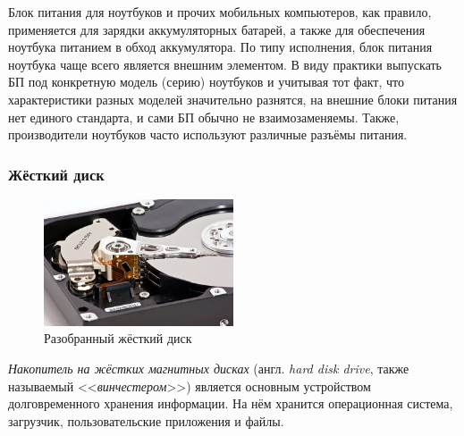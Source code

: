 Блок питания для ноутбуков и прочих мобильных компьютеров, как правило, применяется для зарядки аккумуляторных батарей, а также для обеспечения ноутбука питанием в обход аккумулятора.
По типу исполнения, блок питания ноутбука чаще всего является внешним элементом.
В виду практики выпускать БП под конкретную модель (серию) ноутбуков и учитывая тот факт, что характеристики разных моделей значительно разнятся, на внешние блоки питания нет единого стандарта, и сами БП обычно не взаимозаменяемы.
Также, производители ноутбуков часто используют различные разъёмы питания.

\subsubsection{Жёсткий диск}\label{base:introduction:components:hdd}
\begin{figure}
 \centering
 \includegraphics[width=0.5\textwidth]{base/Introduction/HDD.jpg}
 \caption{Разобранный жёсткий диск}
 \label{base:introduction:components:hddpic}
\end{figure}
\emph{Накопитель на жёстких магнитных дисках} (англ. \emph{hard disk drive}, также называемый <<\emph{винчестером}>>) является основным устройством долговременного хранения информации.
На нём хранится операционная система, загрузчик, пользовательские приложения и файлы.

